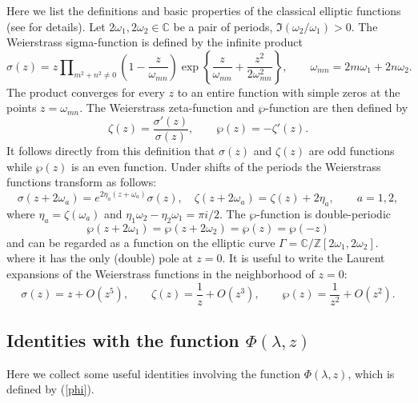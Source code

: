 \documentclass[a4paper,11pt]{article}
\newcommand{\comp}{\mathbb C}
\newcommand{\inte}{\mathbb Z}
\theoremstyle{plain}
\theoremstyle{remark}
\begin{document}
Here we list the definitions and basic properties of the classical
elliptic functions (see \cite{bat} for details).
Let $2\omega_1,2\omega_2\in\comp$
be a pair of periods, $\Im (\omega_2/\omega_1)>0$.
The Weierstrass sigma-function is defined by the infinite product
$$
\sigma(z)= z \prod\nolimits_{m^2+n^2\ne 0} \left( 1-\frac{z}{\omega_{m n}}
\right)
\exp\left\{ \frac{z}{\omega_{m n}}+\frac{z^2}{2 \omega^2_{m n}} \right\},
\qquad
\omega_{m n}=2m \omega_1+2n \omega_2 .
$$
The product converges for every $z$ to an entire function with simple
zeros at the points $z=\omega_{m n}$.
The Weierstrass zeta-function and $\wp$-function are then defined by
$$
\zeta(z)=\frac{\sigma'(z)}{\sigma(z)},\qquad
\wp(z)=-\zeta'(z) .
$$
It follows directly from this definition that $\sigma(z)$ and $\zeta(z)$
are odd functions while $\wp(z)$ is an even function. Under shifts
of the periods the Weierstrass functions transform as follows:
$$
\sigma(z+2\omega_a)=e^{2\eta_a(z+\omega_a)}\sigma(z),\quad
\zeta(z+2\omega_a)=\zeta(z)+2\eta_a,\qquad a=1,2,
$$
where $\eta_a=\zeta(\omega_a)$ and $\eta_1\omega_2-\eta_2\omega_1=\pi i/2$.
The $\wp$-function is double-periodic
$$
\wp(z+2\omega_1)=\wp(z+2\omega_2)=\wp(z)=\wp(-z)
$$
and can be regarded as a function on the elliptic curve
$\Gamma=\comp \bigl/ \inte[2\omega_1,2\omega_2] \bigr.$
where it has the only (double) pole at $z=0$.
It is useful to write the Laurent expansions of the Weierstrass
functions in the neighborhood of $z=0$:
$$
\sigma(z)=z+O(z^5),\qquad \zeta(z)=\frac{1}{z}+O(z^3),\qquad
\wp(z)=\frac{1}{z^2}+O(z^2) .
$$

\subsection{Identities with the function $\Phi(\lambda,z)$}

Here we collect some useful identities involving the function
$\Phi(\lambda,z)$, which is defined by (\ref{phi}).
\end{document}
